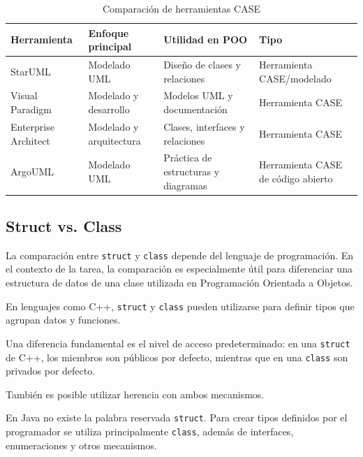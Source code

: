 \documentclass[12pt,a4paper]{article}
\begin{document}
\begin{table}[H]
\centering
\caption{Comparación de herramientas CASE}
\renewcommand{\arraystretch}{1.3}

\begin{tabular}{p{3cm} p{3.5cm} p{4.5cm} p{3cm}}
\toprule
\textbf{Herramienta} &
\textbf{Enfoque principal} &
\textbf{Utilidad en POO} &
\textbf{Tipo} \\
\midrule

StarUML &
Modelado UML &
Diseño de clases y relaciones &
Herramienta CASE/modelado \\

Visual Paradigm &
Modelado y desarrollo &
Modelos UML y documentación &
Herramienta CASE \\

Enterprise Architect &
Modelado y arquitectura &
Clases, interfaces y relaciones &
Herramienta CASE \\

ArgoUML &
Modelado UML &
Práctica de estructuras y diagramas &
Herramienta CASE de código abierto \\

\bottomrule
\end{tabular}

\end{table}


\subsection{Struct vs. Class}

La comparación entre \texttt{struct} y \texttt{class} depende del
lenguaje de programación. En el contexto de la tarea, la comparación
es especialmente útil para diferenciar una estructura de datos de
una clase utilizada en Programación Orientada a Objetos.

En lenguajes como C++, \texttt{struct} y \texttt{class} pueden
utilizarse para definir tipos que agrupan datos y funciones.

Una diferencia fundamental es el nivel de acceso predeterminado:
en una \texttt{struct} de C++, los miembros son públicos por defecto,
mientras que en una \texttt{class} son privados por defecto.

También es posible utilizar herencia con ambos mecanismos.

En Java no existe la palabra reservada \texttt{struct}. Para crear
tipos definidos por el programador se utiliza principalmente
\texttt{class}, además de interfaces, enumeraciones y otros
mecanismos.
\end{document}
